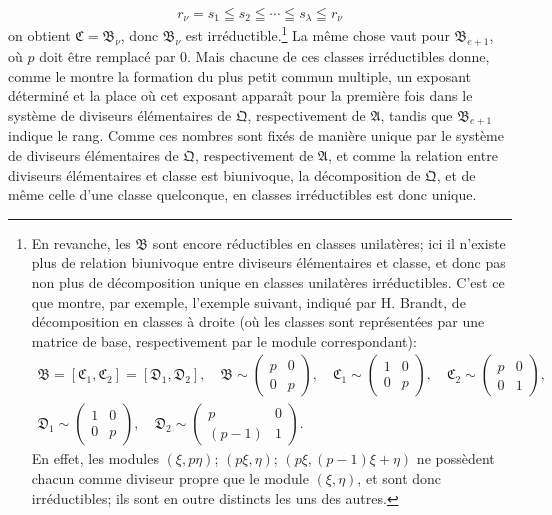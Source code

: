 \[
 r_\nu=s_1\leqq s_2\leqq\cdots\leqq s_\lambda\leqq r_\nu
\]
on obtient $\mathfrak C=\mathfrak B_\nu$, donc $\mathfrak B_\nu$ est irréductible.\footnote{En revanche, les $\mathfrak B$ sont encore réductibles en classes unilatères; ici il n'existe plus de relation biunivoque entre diviseurs élémentaires et classe, et donc pas non plus de décomposition unique en classes unilatères irréductibles. C'est ce que montre, par exemple, l'exemple suivant, indiqué par H. Brandt, de décomposition en classes à droite (où les classes sont représentées par une matrice de base, respectivement par le module correspondant):
\[
\begin{gathered}
 \mathfrak B=[\mathfrak C_1,\mathfrak C_2]=[\mathfrak D_1,\mathfrak D_2],\quad
 \mathfrak B\sim\begin{pmatrix}p&0\\0&p\end{pmatrix},\quad
 \mathfrak C_1\sim\begin{pmatrix}1&0\\0&p\end{pmatrix},\quad
 \mathfrak C_2\sim\begin{pmatrix}p&0\\0&1\end{pmatrix},\\
 \mathfrak D_1\sim\begin{pmatrix}1&0\\0&p\end{pmatrix},
 \quad
 \mathfrak D_2\sim\begin{pmatrix}p&0\\(p-1)&1\end{pmatrix}.
\end{gathered}
\]
En effet, les modules $(\xi,p\eta)$; $(p\xi,\eta)$; $(p\xi,(p-1)\xi+\eta)$ ne possèdent chacun comme diviseur propre que le module $(\xi,\eta)$, et sont donc irréductibles; ils sont en outre distincts les uns des autres.} La même chose vaut pour $\mathfrak B_{e+1}$, où $p$ doit être remplacé par $0$. Mais chacune de ces classes irréductibles donne, comme le montre la formation du plus petit commun multiple, un exposant déterminé et la place où cet exposant apparaît pour la première fois dans le système de diviseurs élémentaires de $\mathfrak Q$, respectivement de $\mathfrak A$, tandis que $\mathfrak B_{e+1}$ indique le rang. Comme ces nombres sont fixés de manière unique par le système de diviseurs élémentaires de $\mathfrak Q$, respectivement de $\mathfrak A$, et comme la relation entre diviseurs élémentaires et classe est biunivoque, la décomposition de $\mathfrak Q$, et de même celle d'une classe quelconque, en classes irréductibles est donc unique.

